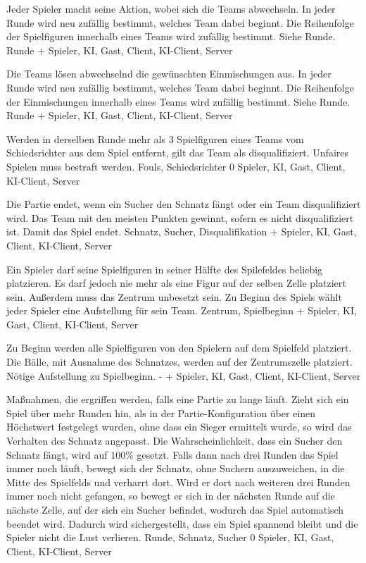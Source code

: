         {Jeder Spieler macht seine Aktion, wobei sich die Teams abwechseln. In jeder Runde wird neu zufällig bestimmt, welches Team dabei beginnt. Die Reihenfolge der Spielfiguren innerhalb eines Teams wird zufällig bestimmt.}
        {Siehe Runde.}
        {Runde}
        {+}
        {Spieler, KI, Gast, Client, KI-Client, Server}
        
        {Die Teams lösen abwechselnd die gewünschten Einmischungen aus. In jeder Runde wird neu zufällig bestimmt, welches Team dabei beginnt. Die Reihenfolge der Einmischungen innerhalb eines Teams wird zufällig bestimmt.}
        {Siehe Runde.}
        {Runde}
        {+}
        {Spieler, KI, Gast, Client, KI-Client, Server}

        {Werden in derselben Runde mehr als 3 Spielfiguren eines Teams vom Schiedsrichter aus dem Spiel entfernt, gilt das Team als disqualifiziert.}
        {Unfaires Spielen muss bestraft werden.}
        {Fouls, Schiedsrichter}
        {0}
        {Spieler, KI, Gast, Client, KI-Client, Server}
        
        {Die Partie endet, wenn ein Sucher den Schnatz fängt oder ein Team disqualifiziert wird. Das Team mit den meisten Punkten gewinnt, sofern es nicht disqualifiziert ist.}
        {Damit das Spiel endet.}
        {Schnatz, Sucher, Disqualifikation}
        {+}
        {Spieler, KI, Gast, Client, KI-Client, Server}
        
        {Ein Spieler darf seine Spielfiguren in seiner Hälfte des Spilefeldes beliebig platzieren. Es darf jedoch nie mehr als eine Figur auf der selben Zelle platziert sein. Außerdem muss das Zentrum unbesetzt sein.}
        {Zu Beginn des Spiels wählt jeder Spieler eine Aufstellung für sein Team.}
        {Zentrum, Spielbeginn}
        {+}
        {Spieler, KI, Gast, Client, KI-Client, Server}	
        
        {Zu Beginn werden alle Spielfiguren von den Spielern auf dem Spielfeld platziert. Die Bälle, mit Ausnahme des Schnatzes, werden auf der Zentrumszelle platziert.}
        {Nötige Aufstellung zu Spielbeginn.}
        {-}
        {+}
        {Spieler, KI, Gast, Client, KI-Client, Server}
        
        {Maßnahmen, die ergriffen werden, falls eine Partie zu lange läuft. Zieht sich ein Spiel über mehr Runden hin, als in der Partie-Konfiguration über einen Höchstwert festgelegt wurden, ohne dass ein Sieger ermittelt wurde, so wird das Verhalten des Schnatz angepasst. Die Wahrscheinlichkeit, dass ein Sucher den Schnatz fängt, wird auf $100\%$ gesetzt. Falls dann nach drei Runden das Spiel immer noch läuft, bewegt sich der Schnatz, ohne Suchern auszuweichen, in die Mitte des Spielfelds und verharrt dort. Wird er dort nach weiteren drei Runden immer noch nicht gefangen, so bewegt er sich in der nächsten Runde auf die nächste Zelle, auf der sich ein Sucher befindet, wodurch das Spiel automatisch beendet wird.}
        {Dadurch wird sichergestellt, dass ein Spiel spannend bleibt und die Spieler nicht die Lust verlieren.}
        {Runde, Schnatz, Sucher}
        {0}
        {Spieler, KI, Gast, Client, KI-Client, Server}


